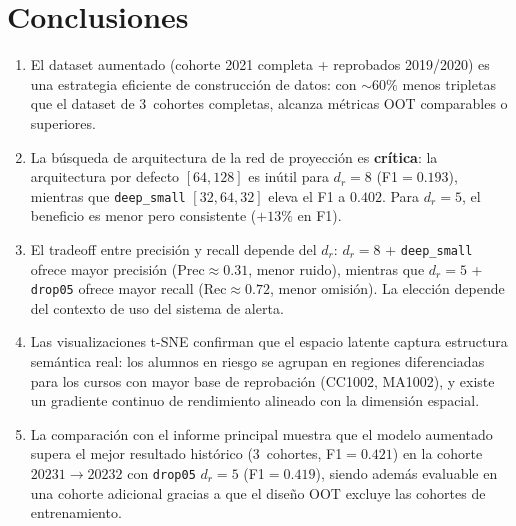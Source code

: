 \documentclass[11pt,a4paper]{article}
\begin{document}
\section{Conclusiones}

\begin{enumerate}
    \item El dataset aumentado (cohorte 2021 completa + reprobados 2019/2020) es una
    estrategia eficiente de construcción de datos: con ${\sim}60\%$ menos tripletas que
    el dataset de 3~cohortes completas, alcanza métricas OOT comparables o superiores.
    
    \item La búsqueda de arquitectura de la red de proyección es \textbf{crítica}:
    la arquitectura por defecto $[64,128]$ es inútil para $d_r=8$ (F1$=0.193$),
    mientras que \texttt{deep\_small} $[32,64,32]$ eleva el F1 a $0.402$.
    Para $d_r=5$, el beneficio es menor pero consistente ($+13\%$ en F1).
    
    \item El tradeoff entre precisión y recall depende del $d_r$:
    $d_r=8$ + \texttt{deep\_small} ofrece mayor precisión (Prec$\approx 0.31$, menor ruido),
    mientras que $d_r=5$ + \texttt{drop05} ofrece mayor recall (Rec$\approx 0.72$, menor
    omisión). La elección depende del contexto de uso del sistema de alerta.
    
    \item Las visualizaciones t-SNE confirman que el espacio latente captura estructura
    semántica real: los alumnos en riesgo se agrupan en regiones diferenciadas para los
    cursos con mayor base de reprobación (CC1002, MA1002), y existe un gradiente
    continuo de rendimiento alineado con la dimensión espacial.
    
    \item La comparación con el informe principal muestra que el modelo aumentado supera
    el mejor resultado histórico (3~cohortes, F1$=0.421$) en la cohorte $20231 \to 20232$
    con \texttt{drop05} $d_r=5$ (F1$=0.419$), siendo además evaluable en una cohorte
    adicional gracias a que el diseño OOT excluye las cohortes de entrenamiento.
\end{enumerate}
\end{document}
